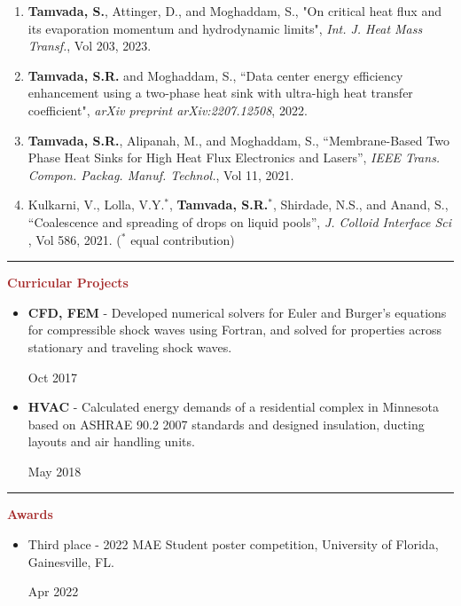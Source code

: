 \documentclass[11pt, letterpaper]{article}
\begin{document}
\begin{enumerate}[leftmargin=*]
\setlength\itemsep{-1pt}
\vspace{-8pt}
\item \textbf{Tamvada, S.}, Attinger, D., and Moghaddam, S., "On critical heat flux and its evaporation momentum and hydrodynamic limits", \textit{Int. J. Heat Mass Transf.}, Vol 203, 2023.
\item \textbf{Tamvada, S.R.} and Moghaddam, S., ``Data center energy efficiency enhancement using a two-phase heat sink with ultra-high heat transfer coefficient", \textit{arXiv preprint arXiv:2207.12508}, 2022.
\item \textbf{Tamvada, S.R.}, Alipanah, M., and Moghaddam, S., ``Membrane-Based Two Phase Heat Sinks for High Heat Flux Electronics and Lasers'', \textit{IEEE Trans. Compon. Packag. Manuf. Technol.}, Vol 11, 2021.
\item Kulkarni, V., Lolla, V.Y.$^\ast$, \textbf{Tamvada, S.R.}$^\ast$, Shirdade, N.S., and Anand, S., ``Coalescence and spreading of drops on liquid pools'', \textit{J. Colloid Interface Sci }, Vol 586, 2021. ($^\ast$ equal contribution)
\end{enumerate}
\vspace{-10pt}
\noindent \rule[2pt]{\textwidth}{0.5pt}
\noindent \textbf{\large \textcolor{Brown}{Curricular Projects}}\\
\begin{itemize}[leftmargin=*]
\setlength\itemsep{-2pt}
\vspace{-8pt}
\item \textbf{CFD, FEM} - Developed numerical solvers for Euler and Burger's equations for compressible shock waves using Fortran, and solved for properties across stationary and traveling shock waves. \hfill \raggedright{Oct 2017}
\item \textbf{HVAC} - Calculated energy demands of a residential complex in Minnesota based on ASHRAE 90.2 2007 standards and designed insulation, ducting layouts and air handling units. \hfill \raggedright{May 2018}
\end{itemize}
\vspace{-10pt}
\noindent \rule[2pt]{\textwidth}{0.5pt}
\noindent \textbf{\large \textcolor{Brown}{Awards}}\\
\begin{itemize}[leftmargin=*]
\setlength\itemsep{-1pt}
\vspace{-8pt}
\item Third place - 2022 MAE Student poster competition, University of Florida, Gainesville, FL. \hfill \raggedright{Apr 2022}
\end{itemize}
\end{document}
